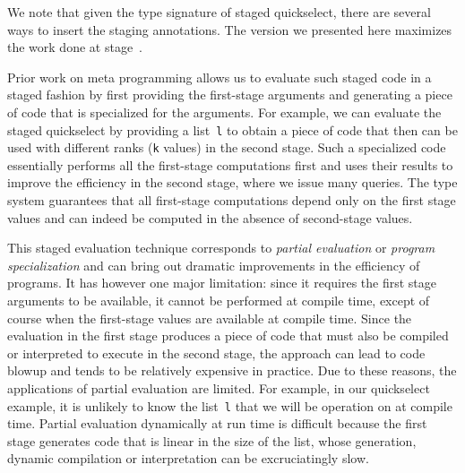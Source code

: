 We note that given the type signature of staged quickselect, there are
several ways to insert the staging annotations.  The version we
presented here maximizes the work done at stage~\bbone.  









Prior work on meta programming allows us to evaluate such staged code
in a staged fashion by first providing the first-stage arguments and
generating a piece of code that is specialized for the arguments.  For
example, we can evaluate the staged quickselect by providing a
list~\texttt{l} to obtain a piece of code that then can be used with
different ranks (\texttt{k} values) in the second stage.  Such a
specialized code essentially performs all the first-stage computations
first and uses their results to improve the efficiency in the second
stage, where we issue many queries.  The type system guarantees that
all first-stage computations depend only on the first stage values and
can indeed be computed in the absence of second-stage values.  

This staged evaluation technique corresponds to {\em partial
  evaluation} or {\em program specialization} and can bring out
dramatic improvements in the efficiency of programs.  It has however
one major limitation: since it requires the first stage arguments to
be available, it cannot be performed at compile time, except of course
when the first-stage values are available at compile time.  Since the
evaluation in the first stage produces a piece of code that must also
be compiled or interpreted to execute in the second stage, the
approach can lead to code blowup and tends to be relatively expensive
in practice.  Due to these reasons, the applications of partial
evaluation are limited.  For example, in our quickselect example, it
is unlikely to know the list~\texttt{l} that we will be operation on
at compile time. Partial evaluation dynamically at run time is
difficult because the first stage generates code that is linear in the
size of the list, whose generation, dynamic compilation or
interpretation can be excruciatingly slow.

